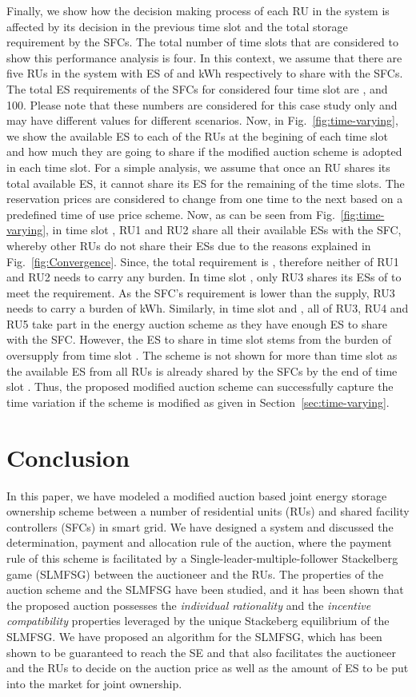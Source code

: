 \documentclass[journal,10pt]{IEEEtran}
\begin{document}
Finally, we show how the decision making process of each RU in the system is affected by its decision in the previous time slot and the total storage requirement by the SFCs. The total number of time slots that are considered to show this performance analysis is four. In this context, we assume that there are five RUs in the system with ES of  and  kWh respectively to share with the SFCs. The total ES requirements of the SFCs for considered four time slot are , and 100. Please note that these numbers are considered for this case study only and may have different values for different scenarios. Now, in Fig.~\ref{fig:time-varying}, we show the available ES to each of the RUs at the begining of each time slot and how much they are going to share if the modified auction scheme is adopted in each time slot. For a simple analysis, we assume that once an RU shares its total available ES, it cannot share its ES for the remaining of the time slots. The reservation prices are considered to change from one time to the next based on a predefined time of use price scheme. Now, as can be seen from Fig.~\ref{fig:time-varying}, in time slot , RU1 and RU2 share all their available ESs with the SFC, whereby other RUs do not share their ESs due to the reasons explained in Fig.~\ref{fig:Convergence}. Since, the total requirement is , therefore neither of RU1 and RU2 needs to carry any burden. In time slot , only RU3 shares its ESs of  to meet the requirement. As the SFC's requirement is lower than the supply, RU3 needs to carry a burden of  kWh. Similarly, in time slot  and , all of RU3, RU4 and RU5 take part in the energy auction scheme as they have enough ES to share with the SFC. However, the ES to share in time slot  stems from the burden of oversupply from time slot . The scheme is not shown for more than time slot  as the available ES from all RUs is already shared by the SFCs by the end of time slot . Thus, the proposed modified auction scheme can successfully capture the time variation if the scheme is modified as given in Section~\ref{sec:time-varying}.

\section{Conclusion}\label{sec:conclusion}
In this paper, we have modeled a modified auction based joint energy storage ownership scheme between a number of residential units (RUs) and shared facility controllers (SFCs) in smart grid. We have designed a system and discussed the determination, payment and allocation rule of the auction, where the payment rule of this scheme is facilitated by a Single-leader-multiple-follower Stackelberg game (SLMFSG) between the auctioneer and the RUs. The properties of the auction scheme and the SLMFSG have been studied, and it has been shown that the proposed auction possesses the \emph{individual rationality} and the \emph{incentive compatibility} properties leveraged by the unique Stackeberg equilibrium of the SLMFSG. We have proposed an algorithm for the SLMFSG, which has been shown to be guaranteed to reach the SE and that also facilitates the auctioneer and the RUs to decide on the auction price as well as the amount of ES to be put into the market for joint ownership. 
\end{document}
